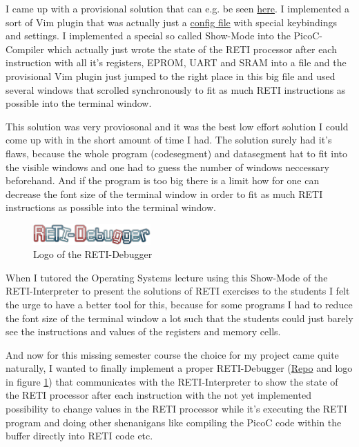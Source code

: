 \documentclass{report}
\begin{document}
I came up with a provisional solution that can e.g. be seen \href{https://asciinema.org/a/526542}{here}. I implemented a sort of Vim plugin that was actually just a \href{https://github.com/matthejue/PicoC-Compiler/blob/master/src/interpr_showcase.vim}{config file} with special keybindings and settings. I implemented a special so called \alert{Show-Mode} into the PicoC-Compiler which actually just wrote the state of the RETI processor after each instruction with all it's registers, EPROM, UART and SRAM into a file and the provisional Vim plugin just jumped to the right place in this big file and used several windows that scrolled synchronously to fit as much RETI instructions as possible into the terminal window.

This solution was very proviosonal and it was the best low effort solution I could come up with in the short amount of time I had. The solution surely had it's flaws, because the whole program (codesegment) and datasegment hat to fit into the visible windows and one had to guess the number of windows neccessary beforehand. And if the program is too big there is a limit how for one can decrease the font size of the terminal window in order to fit as much RETI instructions as possible into the terminal window.

\begin{figure}
	\centering
  \includegraphics[width=0.4\textwidth]{./figures/reti-debugger.png}
	\caption{Logo of the RETI-Debugger}
	\label{fig:logo of the reti debugger}
\end{figure}

When I tutored the Operating Systems lecture using this \alert{Show-Mode} of the RETI-Interpreter to present the solutions of RETI exercises to the students I felt the urge to have a better tool for this, because for some programs I had to reduce the font size of the terminal window a lot such that the students could just barely see the instructions and values of the registers and memory cells.

And now for this missing semester course the choice for my project came quite naturally, I wanted to finally implement a proper \alert{RETI-Debugger} (\href{https://github.com/freiburg-missing-semester-course/project-matthejue}{Repo} and logo in figure \ref{fig:logo of the reti debugger}) that communicates with the RETI-Interpreter to show the state of the RETI processor after each instruction with the not yet implemented possibility to change values in the RETI processor while it's executing the RETI program and doing other shenanigans like compiling the PicoC code within the buffer directly into RETI code etc.
\end{document}
